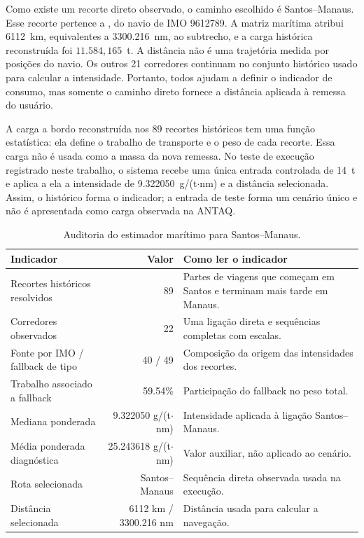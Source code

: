Como existe um recorte direto observado, o caminho escolhido é Santos--Manaus. Esse recorte pertence a , do navio de IMO 9612789. A matriz marítima atribui \num{6112}~km, equivalentes a \num{3300.216}~nm, ao subtrecho, e a carga histórica reconstruída foi \(11.584{,}165\)~t. A distância não é uma trajetória medida por posições do navio. Os outros 21 corredores continuam no conjunto histórico usado para calcular a intensidade. Portanto, todos ajudam a definir o indicador de consumo, mas somente o caminho direto fornece a distância aplicada à remessa do usuário.

A carga a bordo reconstruída nos 89 recortes históricos tem uma função estatística: ela define o trabalho de transporte e o peso de cada recorte. Essa carga não é usada como a massa da nova remessa. No teste de execução registrado neste trabalho, o sistema recebe uma única entrada controlada de 14~t e aplica a ela a intensidade de \num{9.322050}~g/(t$\cdot$nm) e a distância selecionada. Assim, o histórico forma o indicador; a entrada de teste forma um cenário único e não é apresentada como carga observada na ANTAQ.

\begin{table}[htbp]
\centering
\small
\caption{Auditoria do estimador marítimo para Santos--Manaus.}
\label{tab:auditoria-santos-manaus}
\begin{tabularx}{\textwidth}{Y r Y}
\toprule
Indicador & Valor & Como ler o indicador \\
\midrule
Recortes históricos resolvidos & \num{89} & Partes de viagens que começam em Santos e terminam mais tarde em Manaus.\\
Corredores observados & \num{22} & Uma ligação direta e sequências completas com escalas.\\
Fonte por IMO / fallback de tipo & \num{40} / \num{49} & Composição da origem das intensidades dos recortes.\\
Trabalho associado a fallback & \num{59.54}\% & Participação do fallback no peso total.\\
Mediana ponderada & \num{9.322050} g/(t$\cdot$nm) & Intensidade aplicada à ligação Santos--Manaus.\\
Média ponderada diagnóstica & \num{25.243618} g/(t$\cdot$nm) & Valor auxiliar, não aplicado ao cenário.\\
Rota selecionada & Santos--Manaus & Sequência direta observada usada na execução.\\
Distância selecionada & \num{6112} km / \num{3300.216} nm & Distância usada para calcular a navegação.\\
\bottomrule
\end{tabularx}
\end{table}

